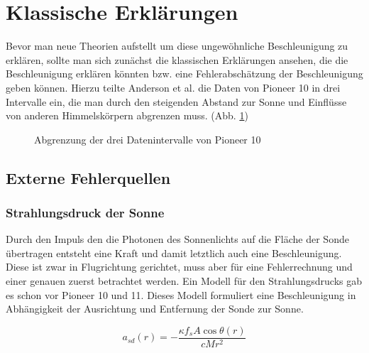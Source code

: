 \section{Klassische Erkl\"arungen}\label{klassisch}

Bevor man neue Theorien aufstellt um diese ungew\"ohnliche
Beschleunigung zu erkl\"aren, sollte man sich zun\"achst die
klassischen Erkl\"arungen ansehen, die die Beschleunigung erkl\"aren
k\"onnten bzw. eine Fehlerabsch\"atzung der Beschleunigung geben
k\"onnen. Hierzu teilte Anderson et al. \cite{Anderson2002} die Daten von Pioneer 10 in drei Intervalle
ein, die man durch den steigenden Abstand zur Sonne und Einfl\"usse von
anderen Himmelsk\"orpern abgrenzen muss. (Abb. \ref{fig:intervalle})

\begin{figure}[htbn]
\begin{center}
\noindent    
{}
\end{center}
\vskip -10pt
  \caption{Abgrenzung der drei Datenintervalle von Pioneer 10 \cite{Anderson2002}}
\label{fig:intervalle}
\end{figure} 

\subsection{Externe Fehlerquellen}\label{extern}

\subsubsection{Strahlungsdruck der Sonne}

Durch den Impuls den die Photonen des Sonnenlichts auf die Fl\"ache der Sonde
\"ubertragen entsteht eine Kraft und damit letztlich auch eine
Beschleunigung. Diese ist zwar in Flugrichtung gerichtet, muss aber
f\"ur eine Fehlerrechnung und einer genauen zuerst betrachtet werden. Ein Modell f\"ur
den Strahlungsdrucks gab es schon vor Pioneer 10 und 11. Dieses Modell
formuliert eine Beschleunigung in Abh\"angigkeit der Ausrichtung und
Entfernung der Sonde zur Sonne.

\begin{equation}\label{eins}
a_{\mathit{sd}}(r)=-\frac{\kappa f_{s}A\cos \theta
(r)}{cMr^{2}}
\end{equation}

